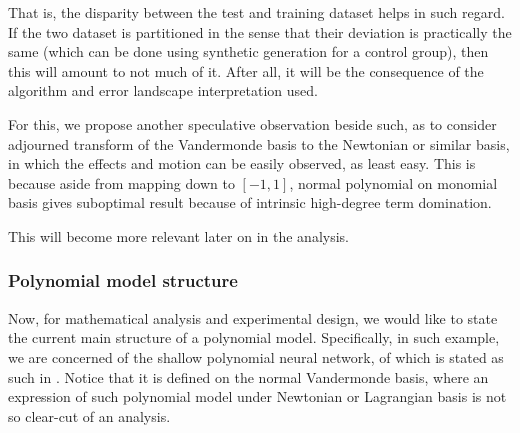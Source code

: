 \documentclass[10pt]{article} %
\begin{document}
That is, the disparity between the test and training dataset helps in such regard. If the two dataset is partitioned in the sense that their deviation is practically the same (which can be done using synthetic generation for a control group), then this will amount to not much of it. After all, it will be the consequence of the algorithm and error landscape interpretation used. 

For this, we propose another speculative observation beside such, as to consider adjourned transform of the Vandermonde basis to the Newtonian or similar basis, in which the effects and motion can be easily observed, as least easy. This is because aside from mapping down to $[-1,1]$, normal polynomial on monomial basis gives suboptimal result because of intrinsic high-degree term domination. 

This will become more relevant later on in the analysis. 

\subsubsection{Polynomial model structure} 

Now, for mathematical analysis and experimental design, we would like to state the current main structure of a polynomial model. Specifically, in such example, we are concerned of the shallow polynomial neural network, of which is stated as such in \cite{arjevani2025geometryoptimizationshallowpolynomial}. Notice that it is defined on the normal Vandermonde basis, where an expression of such polynomial model under Newtonian or Lagrangian basis is not so clear-cut of an analysis.  
\end{document}
